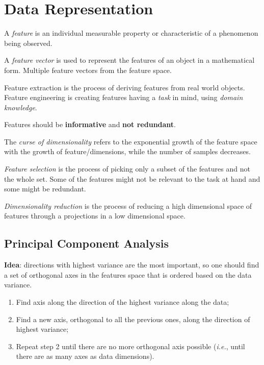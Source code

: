 \documentclass[a4paper]{report}
\begin{document}
\section*{Data Representation}

\begin{definition}
    A \emph{feature} is an individual measurable property or characteristic of a phenomenon being observed.

    A \emph{feature vector} is used to represent the features of an object in a mathematical form. Multiple feature vectors from the feature space.
\end{definition}

Feature extraction is the process of deriving features from real world objects. Feature engineering is creating features having a \emph{task} in mind, using \emph{domain knowledge}.

\begin{note}
    Features should be \textbf{informative} and \textbf{not redundant}.
\end{note}

\begin{definition}
    The \emph{curse of dimensionality} refers to the exponential growth of the feature space with the growth of feature/dimensions, while the number of samples decreases.
\end{definition}

\begin{definition}
    \emph{Feature selection} is the process of picking only a subset of the features and not the whole set. Some of the features might not be relevant to the task at hand and some might be redundant.

    \emph{Dimensionality reduction} is the process of reducing a high dimensional space of features through a projections in a low dimensional space.
\end{definition}

\subsection*{Principal Component Analysis}

\textbf{Idea}: directions with highest variance are the most important, so one should find a set of orthogonal axes in the features space that is ordered based on the data variance.

\begin{enumerate}
    \item Find axis along the direction of the highest variance along the data;
    \item Find a new axis, orthogonal to all the previous ones, along the direction of highest variance;
    \item Repeat step 2 until there are no more orthogonal axis possible (\emph{i.e.}, until there are as many axes as data dimensions).
\end{enumerate}
\end{document}
